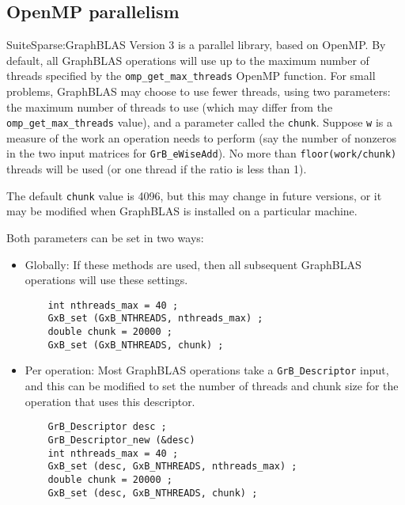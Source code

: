 \documentclass[12pt]{article}
\begin{document}
\subsection{OpenMP parallelism}

SuiteSparse:GraphBLAS Version 3 is a parallel library, based on OpenMP.  By
default, all GraphBLAS operations will use up to the maximum number of threads
specified by the \verb'omp_get_max_threads' OpenMP function.  For small
problems, GraphBLAS may choose to use fewer threads, using two parameters: the
maximum number of threads to use (which may differ from the
\verb'omp_get_max_threads' value), and a parameter called the \verb'chunk'.
Suppose \verb'w' is a measure of the work an operation needs to perform (say
the number of nonzeros in the two input matrices for \verb'GrB_eWiseAdd').  No
more than \verb'floor(work/chunk)' threads will be used (or one thread if the
ratio is less than 1).

The default \verb'chunk' value is 4096, but this may change in future versions,
or it may be modified when GraphBLAS is installed on a particular machine.

Both parameters can be set in two ways:

\begin{itemize}

\item Globally:  If these methods are used, then all subsequent GraphBLAS
operations will use these settings.

    {\footnotesize
    \begin{verbatim}
    int nthreads_max = 40 ;
    GxB_set (GxB_NTHREADS, nthreads_max) ;
    double chunk = 20000 ;
    GxB_set (GxB_NTHREADS, chunk) ; \end{verbatim} }

\item Per operation:  Most GraphBLAS operations take a \verb'GrB_Descriptor'
input, and this can be modified to set the number of threads and chunk
size for the operation that uses this descriptor.

    {\footnotesize
    \begin{verbatim}
    GrB_Descriptor desc ;
    GrB_Descriptor_new (&desc) 
    int nthreads_max = 40 ;
    GxB_set (desc, GxB_NTHREADS, nthreads_max) ;
    double chunk = 20000 ;
    GxB_set (desc, GxB_NTHREADS, chunk) ; \end{verbatim} }

\end{itemize}
\end{document}
